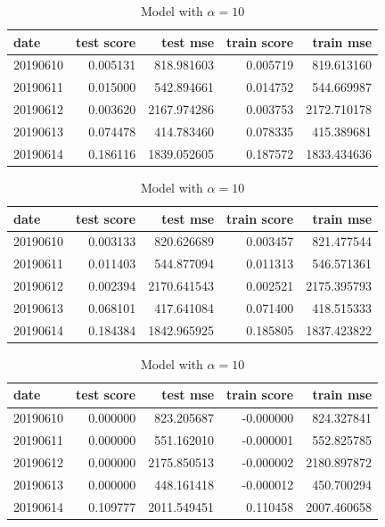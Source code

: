\documentclass[english, 11pt, a4paper]{article}
\begin{document}
\begin{table}[H]
  \centering
  \begin{minipage}{.6\textwidth}
    \centering
    \begin{tabular}{lrrrr}
    \toprule
    date & test score & test mse & train score & train mse \\
    \midrule
    20190610 & 0.005131 & 818.981603 & 0.005719 & 819.613160 \\
    20190611 & 0.015000 & 542.894661 & 0.014752 & 544.669987 \\
    20190612 & 0.003620 & 2167.974286 & 0.003753 & 2172.710178 \\
    20190613 & 0.074478 & 414.783460 & 0.078335 & 415.389681 \\
    20190614 & 0.186116 & 1839.052605 & 0.187572 & 1833.434636 \\
    \bottomrule
    \end{tabular}
    \caption{Model with $\alpha = 0.04$}
  \end{minipage}
  \begin{minipage}{.6\textwidth}
    \centering
    \begin{tabular}{lrrrr}
    \toprule
    date & test score & test mse & train score & train mse \\
    \midrule
    20190610 & 0.003133 & 820.626689 & 0.003457 & 821.477544 \\
    20190611 & 0.011403 & 544.877094 & 0.011313 & 546.571361 \\
    20190612 & 0.002394 & 2170.641543 & 0.002521 & 2175.395793 \\
    20190613 & 0.068101 & 417.641084 & 0.071400 & 418.515333 \\
    20190614 & 0.184384 & 1842.965925 & 0.185805 & 1837.423822 \\
    \bottomrule
    \end{tabular}
    \caption{Model with $\alpha = 1$}
  \end{minipage}
  \begin{minipage}{.6\textwidth}
    \centering
    \begin{tabular}{lrrrr}
    \toprule
    date & test score & test mse & train score & train mse \\
    \midrule
    20190610 & 0.000000 & 823.205687 & -0.000000 & 824.327841 \\
    20190611 & 0.000000 & 551.162010 & -0.000001 & 552.825785 \\
    20190612 & 0.000000 & 2175.850513 & -0.000002 & 2180.897872 \\
    20190613 & 0.000000 & 448.161418 & -0.000012 & 450.700294 \\
    20190614 & 0.109777 & 2011.549451 & 0.110458 & 2007.460658 \\
    \bottomrule
    \end{tabular}
    \caption{Model with $\alpha = 10$}
    \end{minipage}
\end{table}
\end{document}
